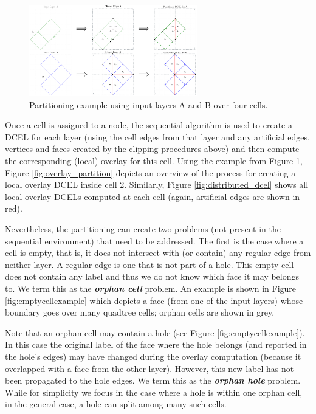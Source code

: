 \begin{figure}
    \centering
    \includegraphics[width=0.65\textwidth]{figures/partition_schema/PolygonsParted}
    \caption{Partitioning example using input layers A and B over four cells.}\label{fig:partition_strategy}
\end{figure}

Once a cell is assigned to a node, the sequential algorithm is used to create a DCEL for each layer (using the cell edges from that layer and any artificial edges, vertices and faces created by the clipping procedures above) and then compute the corresponding (local) overlay for this cell. 
Using the example from Figure \ref{fig:partition_strategy}, Figure \ref{fig:overlay_partition} depicts an overview of the process for creating a local overlay DCEL inside cell 2.  
Similarly, Figure \ref{fig:distributed_dcel} shows all local overlay DCELs computed at each cell (again, artificial edges are shown in red). 

Nevertheless, the partitioning can create two problems (not present in the sequential environment) that need to be addressed. 
The first is the case where a cell is empty, that is, it does not intersect with (or contain) any regular edge from neither layer. A regular edge is one that is not part of a hole.
This empty cell does not contain any label and thus we do not know which face it may belongs to. We term this as the \textbf{\textit{orphan cell}} problem.
An example is shown in Figure \ref{fig:emptycellexample} which depicts a face (from one of the input layers) whose boundary goes over many quadtree cells; orphan cells are shown in grey. 

Note that an orphan cell may contain a hole (see Figure \ref{fig:emptycellexample}). 
In this case the original label of the face where the hole belongs (and reported in the hole's edges) may have changed during the overlay computation (because it overlapped with a face from the other layer). 
However, this new label has not been propagated to the hole edges.
We term this as the \textbf{\textit{orphan hole}} problem.
While for simplicity we focus in the case where a hole is within one orphan cell, in the general case, a hole can split among many such cells.

